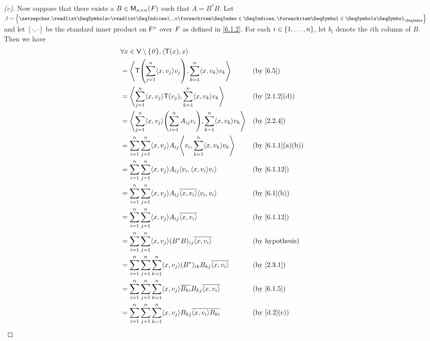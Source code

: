 \begin{proof}[(c)]
  Now suppose that there exists a \(B \in \mathsf{M}_{{n} \times n}({\mathit{F}})\) such that \(A = B^* B\).
  Let \(\beta = \set{\seq{v}{1,,n}}\) and let \([\cdot, \cdot]\) be the standard inner product on \(\mathsf{F}^n\) over \(\mathit{F}\) as defined in \cref{6.1.2}.
  For each \(i \in \left\lbrace1, \dots, n\right\rbrace\), let \(b_i\) denote the \(i\)th column of \(B\).
  Then we have
  \begin{align*}
     & \forall x \in \V \setminus \set{\zv}, \inn{\T(x), x}                                                                                       \\
     & = \inn{\T\pa{\sum_{j = 1}^n \inn{x, v_j} v_j}, \sum_{k = 1}^n \inn{x, v_k} v_k}                        &  & \text{(by \cref{6.5})}         \\
     & = \inn{\sum_{j = 1}^n \inn{x, v_j} \T(v_j), \sum_{k = 1}^n \inn{x, v_k} v_k}                           &  & \text{(by \cref{2.1.2}(d))}    \\
     & = \inn{\sum_{j = 1}^n \inn{x, v_j} \pa{\sum_{i = 1}^n A_{i j} v_i}, \sum_{k = 1}^n \inn{x, v_k} v_k}   &  & \text{(by \cref{2.2.4})}       \\
     & = \sum_{i = 1}^n \sum_{j = 1}^n \inn{x, v_j} A_{i j} \inn{v_i, \sum_{k = 1}^n \inn{x, v_k} v_k}        &  & \text{(by \cref{6.1.1}(a)(b))} \\
     & = \sum_{i = 1}^n \sum_{j = 1}^n \inn{x, v_j} A_{i j} \inn{v_i, \inn{x, v_i} v_i}                       &  & \text{(by \cref{6.1.12})}      \\
     & = \sum_{i = 1}^n \sum_{j = 1}^n \inn{x, v_j} A_{i j} \conj{\inn{x, v_i}} \inn{v_i, v_i}                &  & \text{(by \cref{6.1}(b))}      \\
     & = \sum_{i = 1}^n \sum_{j = 1}^n \inn{x, v_j} A_{i j} \conj{\inn{x, v_i}}                               &  & \text{(by \cref{6.1.12})}      \\
     & = \sum_{i = 1}^n \sum_{j = 1}^n \inn{x, v_j} (B^* B)_{i j} \conj{\inn{x, v_i}}                         &  & \text{(by hypothesis)}         \\
     & = \sum_{i = 1}^n \sum_{j = 1}^n \sum_{k = 1}^n \inn{x, v_j} (B^*)_{i k} B_{k j} \conj{\inn{x, v_i}}    &  & \text{(by \cref{2.3.1})}       \\
     & = \sum_{i = 1}^n \sum_{j = 1}^n \sum_{k = 1}^n \inn{x, v_j} \conj{B_{k i}} B_{k j} \conj{\inn{x, v_i}} &  & \text{(by \cref{6.1.5})}       \\
     & = \sum_{i = 1}^n \sum_{j = 1}^n \sum_{k = 1}^n \inn{x, v_j} B_{k j} \conj{\inn{x, v_i} B_{k i}}        &  & \text{(by \cref{d.2}(c))}      \\

\end{align*}
\end{proof}
